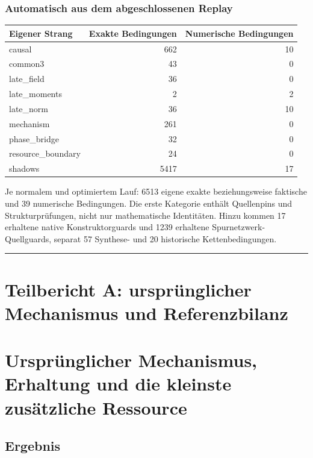\subsubsection{Automatisch aus dem abgeschlossenen
Replay}\label{automatisch-aus-dem-abgeschlossenen-replay-1}

{\def\LTcaptype{none} %
\begin{longtable}[]{@{}lrr@{}}
\toprule\noalign{}
Eigener Strang & Exakte Bedingungen & Numerische Bedingungen \\
\midrule\noalign{}
\endhead
\bottomrule\noalign{}
\endlastfoot
causal & 662 & 10 \\
common3 & 43 & 0 \\
late\_field & 36 & 0 \\
late\_moments & 2 & 2 \\
late\_norm & 36 & 10 \\
mechanism & 261 & 0 \\
phase\_bridge & 32 & 0 \\
resource\_boundary & 24 & 0 \\
shadows & 5417 & 17 \\
\end{longtable}
}

Je normalem und optimiertem Lauf: 6513 eigene exakte beziehungsweise
faktische und 39 numerische Bedingungen. Die erste Kategorie enthält
Quellenpins und Strukturprüfungen, nicht nur mathematische Identitäten.
Hinzu kommen 17 erhaltene native Konstruktorguards und 1239 erhaltene
Spurnetzwerk-Quellguards, separat 57 Synthese- und 20 historische
Kettenbedingungen.

\begin{center}\rule{0.5\linewidth}{0.5pt}\end{center}

\section{Teilbericht A: ursprünglicher Mechanismus und
Referenzbilanz}\label{teilbericht-a-urspruxfcnglicher-mechanismus-und-referenzbilanz}

\section{Ursprünglicher Mechanismus, Erhaltung und die kleinste
zusätzliche
Ressource}\label{urspruxfcnglicher-mechanismus-erhaltung-und-die-kleinste-zusuxe4tzliche-ressource}

\subsection{Ergebnis}\label{ergebnis-1}

